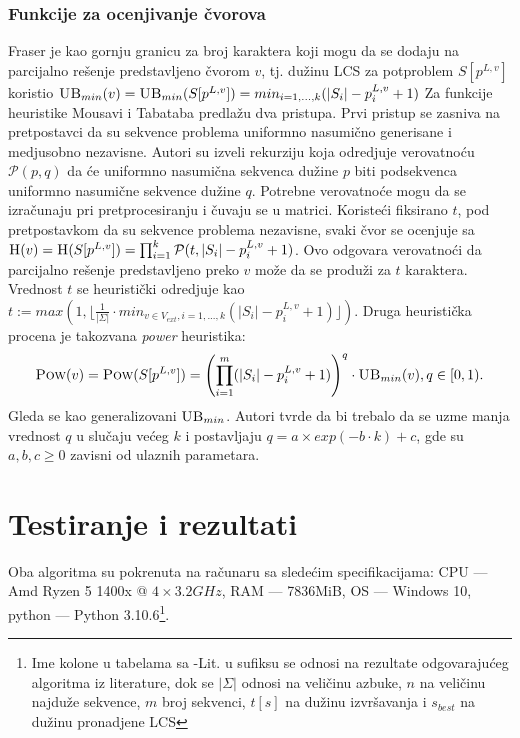 \documentclass{article}
\begin{document}
    \subsubsection{Funkcije za ocenjivanje čvorova}
    Fraser \cite{fr} je kao gornju granicu za broj karaktera koji mogu da se dodaju na parcijalno rešenje predstavljeno čvorom $v$, tj. dužinu LCS za potproblem $S[p^{L,v}]$ koristio $\textsc{UB}_{min}(v) = \textsc{UB}_{min}(S[p^{L,v}]) = min_{i={1,...,k}}(|S_i|-p_i^{L,v}+1)$ \newline
    \indent Za funkcije heuristike Mousavi i Tabataba \cite{mt, mt2} predlažu dva pristupa. Prvi pristup se zasniva na pretpostavci da su sekvence problema uniformno nasumično generisane i medjusobno nezavisne. Autori su izveli rekurziju koja odredjuje verovatnoću $\mathcal{P}(p, q)$ da će uniformno nasumična sekvenca dužine $p$ biti podsekvenca uniformno nasumične sekvence dužine $q$. Potrebne verovatnoće mogu da se izračunaju pri pretprocesiranju i čuvaju se u matrici. Koristeći fiksirano $t$, pod pretpostavkom da su sekvence problema nezavisne, svaki čvor se ocenjuje sa $\textsc{H}(v) = \textsc{H}(S[p^{L,v}]) = \prod_{i=1}^k\mathcal{P}(t, |S_i|-p_i^{L,v}+1)$. Ovo odgovara verovatnoći da parcijalno rešenje predstavljeno preko $v$ može da se produži za $t$ karaktera. Vrednost $t$ se heuristički odredjuje kao $t := max(1, \lfloor \frac{1}{|\Sigma|} \cdot min_{v \in V_{ext},i={1,...,k}}(|S_i|-p_i^{L,v}+1) \rfloor)$. Druga heuristička procena je takozvana \emph{power} heuristika:
    $$ \textsc{Pow}(v) = \textsc{Pow}(S[p^{L,v}]) = \left(\prod_{i=1}^m(|S_i|-p_i^{L,v}+1)\right)^q\cdot \textsc{UB}_{min}(v), q \in [0,1).$$
    Gleda se kao generalizovani $\textsc{UB}_{min}$. Autori tvrde da bi trebalo da se uzme manja vrednost $q$ u slučaju većeg $k$ i postavljaju $q = a \times exp (-b\cdot k) + c$, gde su $a, b, c \geq 0$ zavisni od ulaznih parametara.


    \section{Testiranje i rezultati}
    Oba algoritma su pokrenuta na računaru sa sledećim specifikacijama: CPU --- Amd Ryzen 5 1400x @ $4 \times 3.2GHz$, RAM --- 7836MiB,  OS --- Windows 10, python --- Python 3.10.6\footnote{Ime kolone u tabelama sa -Lit. u sufiksu se odnosi na rezultate odgovarajućeg algoritma iz literature, dok se $|\Sigma|$ odnosi na veličinu azbuke, $n$ na veličinu najduže sekvence, $m$ broj sekvenci, $t[s]$ na dužinu izvršavanja i $s_{best}$ na dužinu pronadjene LCS}.
\end{document}
